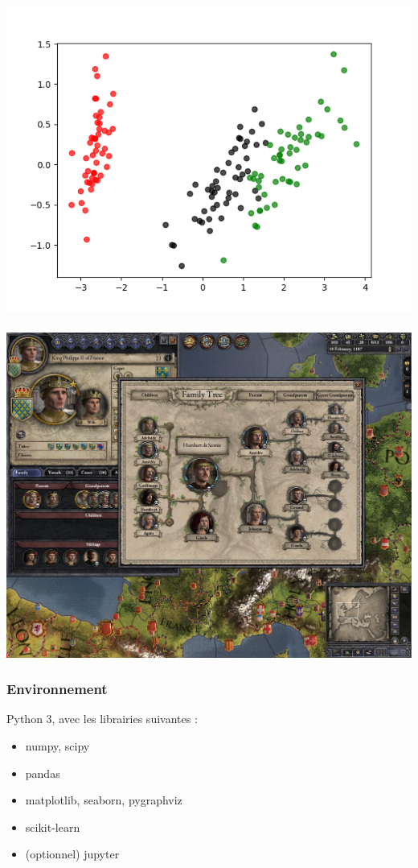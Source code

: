 \documentclass[11pt]{beamer}
\newenvironment{slide}[1]{%
\begin{frame}[environment=slide]
\frametitle{#1}
}{%
\end{frame}
}
\begin{document}
\begin{slide}{}

\includegraphics[scale=0.5]{A8classif}

\end{slide}

\begin{slide}{}

\includegraphics[scale=0.25]{A9videogames}

\end{slide}


\begin{slide}{Environnement}
Python 3, avec les librairies suivantes :\\

\begin{itemize}
	\item numpy, scipy
	\item pandas
	\item matplotlib, seaborn, pygraphviz
	\item scikit-learn
	\item (optionnel) jupyter
\end{itemize}	
	
\end{slide}
\end{document}
